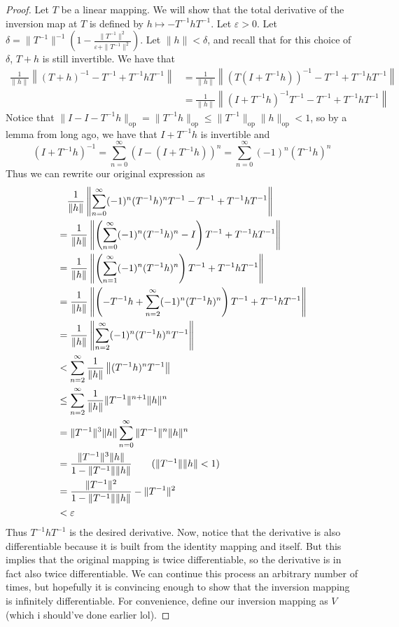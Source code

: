 \documentclass{article}
\newcommand{\op}{\mathrm{op}}
\theoremstyle{plain} %
\numberwithin{thm}{section} %
\theoremstyle{definition}
\begin{document}
\begin{proof}
    Let \(T\) be a linear mapping. We will show that the total derivative of the inversion map at \(T\) is defined by \(h \mapsto -T^{-1} h T^{-1}\). Let \(\varepsilon > 0\). Let \(\delta = \|T^{-1}\|^{-1}(1 - \frac{\|T^{-1}\|^2}{\varepsilon + \|T^{-1}\|^2})\). Let \(\|h\| < \delta\), and recall that for this choice of \(\delta\), \(T + h\) is still invertible. We have that
    \begin{align*}
        \frac{1}{\|h\|}\left\lVert (T + h)^{-1} - T^{-1} + T^{-1} h T^{-1} \right\rVert &= \frac{1}{\|h\|}\left\lVert (T(I + T^{-1}h))^{-1} - T^{-1} + T^{-1} h T^{-1} \right\rVert \\
        &= \frac{1}{\|h\|}\left\lVert (I + T^{-1}h)^{-1}T^{-1} - T^{-1} + T^{-1} h T^{-1} \right\rVert
    \end{align*}
    Notice that \(\|I - I - T^{-1}h\|_{\op} = \|T^{-1}h\|_{\op} \leq \|T^{-1}\|_{\op}\|h\|_{\op} < 1\), so by a lemma from long ago, we have that \(I + T^{-1} h\) is invertible and
    \[
        (I + T^{-1}h)^{-1} = \sum_{n=0}^{\infty} (I - (I + T^{-1}h))^n = \sum_{n=0}^{\infty} (-1)^n (T^{-1} h)^n
    \]
    Thus we can rewrite our original expression as
    \begin{align*}
        &\quad\frac{1}{\|h\|}\left\lVert \sum_{n=0}^{\infty} (-1)^n (T^{-1} h)^n T^{-1} - T^{-1} + T^{-1} h T^{-1} \right\rVert \\
        &=\frac{1}{\|h\|}\left\lVert \left( \sum_{n=0}^{\infty} (-1)^n (T^{-1} h)^n - I \right) T^{-1} + T^{-1} h T^{-1} \right\rVert \\
        &= \frac{1}{\|h\|}\left\lVert \left( \sum_{n=1}^{\infty} (-1)^n (T^{-1} h)^n\right) T^{-1} + T^{-1} h T^{-1} \right\rVert \\
        &= \frac{1}{\|h\|}\left\lVert \left( - T^{-1}h + \sum_{n=2}^{\infty} (-1)^n (T^{-1} h)^n\right) T^{-1} + T^{-1} h T^{-1} \right\rVert \\
        &=\frac{1}{\|h\|}\left\lVert \sum_{n=2}^{\infty} (-1)^n (T^{-1} h)^n T^{-1} \right\rVert \\
        &<  \sum_{n=2}^{\infty}\frac{1}{\|h\|}\left\lVert (T^{-1} h)^n T^{-1} \right\rVert \\
        &\leq \sum_{n=2}^{\infty}\frac{1}{\|h\|}\|T^{-1}\|^{n+1}\|h\|^n \\
        &=\|T^{-1}\|^3 \|h\|\sum_{n=0}^{\infty} \|T^{-1} \|^n \|h\|^n \\
        &= \frac{\|T^{-1}\|^3 \|h\|}{1 - \|T^{-1}\|\|h\|} \tag{\(\|T^{-1}\|\|h\| < 1\)} \\
        &= \frac{\|T^{-1}\|^2}{1 - \|T^{-1}\|\|h\|} - \|T^{-1}\|^2 \\
        &< \varepsilon
    \end{align*}
    Thus \(T^{-1} h T^{-1}\) is the desired derivative. Now, notice that the derivative is also differentiable because it is built from the identity mapping and itself. But this implies that the original mapping is twice differentiable, so the derivative is in fact also twice differentiable. We can continue this process an arbitrary number of times, but hopefully it is convincing enough to show that the inversion mapping is infinitely differentiable. For convenience, define our inversion mapping as \(V\) (which i should've done earlier lol).


\end{proof}
\end{document}
